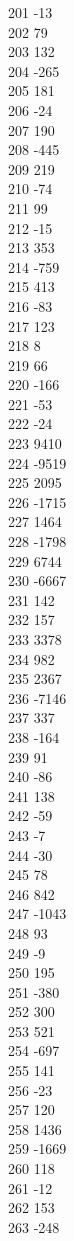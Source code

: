 { 201	-13 \\
 202	79 \\
 203	132 \\
 204	-265 \\
 205	181 \\
 206	-24 \\
 207	190 \\
 208	-445 \\
 209	219 \\
 210	-74 \\
 211	99 \\
 212	-15 \\
 213	353 \\
 214	-759 \\
 215	413 \\
 216	-83 \\
 217	123 \\
 218	8 \\
 219	66 \\
 220	-166 \\
 221	-53 \\
 222	-24 \\
 223	9410 \\
 224	-9519 \\
 225	2095 \\
 226	-1715 \\
 227	1464 \\
 228	-1798 \\
 229	6744 \\
 230	-6667 \\
 231	142 \\
 232	157 \\
 233	3378 \\
 234	982 \\
 235	2367 \\
 236	-7146 \\
 237	337 \\
 238	-164 \\
 239	91 \\
 240	-86 \\
 241	138 \\
 242	-59 \\
 243	-7 \\
 244	-30 \\
 245	78 \\
 246	842 \\
 247	-1043 \\
 248	93 \\
 249	-9 \\
 250	195 \\
 251	-380 \\
 252	300 \\
 253	521 \\
 254	-697 \\
 255	141 \\
 256	-23 \\
 257	120 \\
 258	1436 \\
 259	-1669 \\
 260	118 \\
 261	-12 \\
 262	153 \\
 263	-248 \\
}
